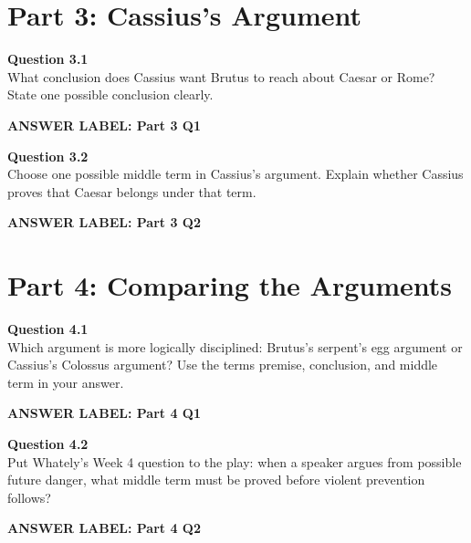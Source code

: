 \documentclass[12pt]{article}
\newcommand{\answerbox}[2]{%
\vspace{0.12em}
\noindent\textbf{#1}\par
\vspace{0.04em}
\noindent\fbox{%
\begin{minipage}[t][#2]{\dimexpr\textwidth-2\fboxsep-2\fboxrule}
\rule{\textwidth}{0pt}
\vspace{#2}
\end{minipage}}
\par\vspace{0.22em}}
\begin{document}
\newpage

\section*{Part 3: Cassius's Argument}

\textbf{Question 3.1}\\[-0.15em]
What conclusion does Cassius want Brutus to reach about Caesar or Rome? State one possible conclusion clearly.

\answerbox{ANSWER LABEL: Part 3 Q1}{2.0in}

\textbf{Question 3.2}\\[-0.15em]
Choose one possible middle term in Cassius's argument. Explain whether Cassius proves that Caesar belongs under that term.

\answerbox{ANSWER LABEL: Part 3 Q2}{2.65in}

\newpage

\section*{Part 4: Comparing the Arguments}

\textbf{Question 4.1}\\[-0.15em]
Which argument is more logically disciplined: Brutus's serpent's egg argument or Cassius's Colossus argument? Use the terms premise, conclusion, and middle term in your answer.

\answerbox{ANSWER LABEL: Part 4 Q1}{2.45in}

\textbf{Question 4.2}\\[-0.15em]
Put Whately's Week 4 question to the play: when a speaker argues from possible future danger, what middle term must be proved before violent prevention follows?

\answerbox{ANSWER LABEL: Part 4 Q2}{2.45in}
\end{document}

